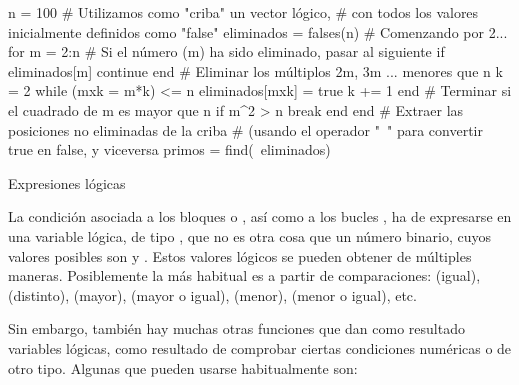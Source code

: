 ﻿\documentclass[spanish]{article}
\begin{document}
n = 100
# Utilizamos como "criba" un vector lógico,
# con todos los valores inicialmente definidos como "false"
eliminados = falses(n)
# Comenzando por 2...
for m = 2:n
  # Si el número (m) ha sido eliminado, pasar al siguiente
  if eliminados[m]
    continue
  end
  # Eliminar los múltiplos 2m, 3m ... menores que n
  k = 2
  while (mxk = m*k) <= n
    eliminados[mxk] = true
    k += 1
  end
  # Terminar si el cuadrado de m es mayor que n 
  if m^2 > n
    break
  end
end
# Extraer las posiciones no eliminadas de la criba
# (usando el operador "~" para convertir true en false, y viceversa
primos = find(~eliminados)


Expresiones lógicas

La condición asociada a los bloques  o , así como a los bucles , ha de expresarse en una variable lógica, de tipo , que no es otra cosa que un número binario, cuyos valores posibles son  y . Estos valores lógicos se pueden obtener de múltiples maneras. Posiblemente la más habitual es a partir de comparaciones:
\code{==} (igual), \code{!=} (distinto),
\code{>} (mayor), \code{>=} (mayor o igual),
\code{<} (menor), \code{<=} (menor o igual), etc.

Sin embargo, también hay muchas otras funciones que dan como resultado variables lógicas, como resultado de comprobar ciertas condiciones numéricas o de otro tipo. Algunas que pueden usarse habitualmente son:
\end{document}

